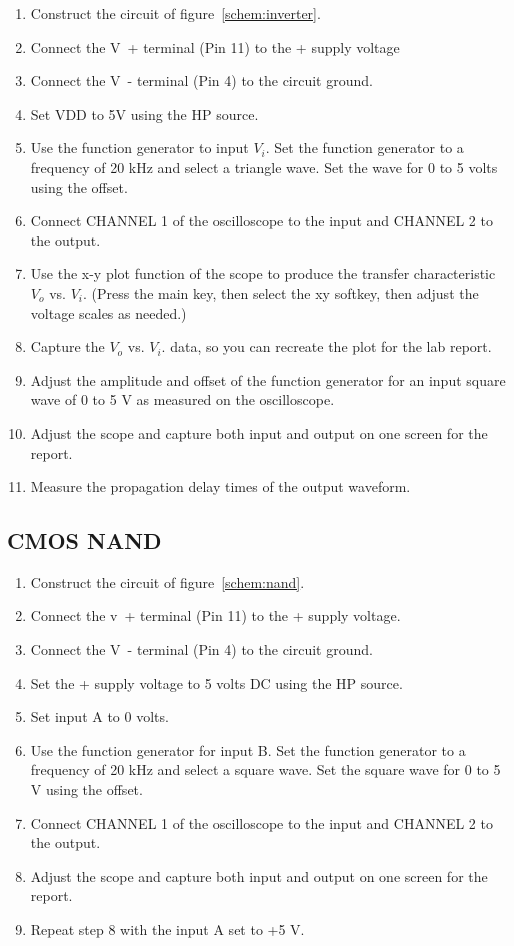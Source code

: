\begin{enumerate}
\item Construct the circuit of figure~\ref{schem:inverter}.
\item Connect the \si{V+} terminal (Pin 11) to the + supply voltage
\item Connect the \si{V-} terminal (Pin 4) to the circuit ground.
\item Set VDD to 5V using the HP source.
\item Use the function generator to input $V_i$. Set the function generator to a frequency of 20 kHz and select a triangle wave. Set the wave for 0 to 5 volts using the offset.
\item Connect CHANNEL 1 of the oscilloscope to the input and CHANNEL 2 to the output.
\item Use the x-y plot function of the scope to produce the transfer characteristic $V_o$ vs. $V_i$. (Press the main key, then select the xy softkey, then adjust the voltage scales as needed.)
\item Capture the $V_o$ vs. $V_i$.  data, so you can recreate the plot for the lab report.
\item Adjust the amplitude and offset of the function generator for an input square wave of 0 to 5 V as measured on the oscilloscope.
\item Adjust the scope and capture both input and output on one screen for the report.
\item Measure the propagation delay times of the output waveform.
\end{enumerate}

\subsection{CMOS NAND}
\label{sec:nand}

\begin{enumerate}
\item Construct the circuit of figure~\ref{schem:nand}.
\item Connect the \si{v+} terminal (Pin 11) to the + supply voltage.
\item Connect the \si{V-} terminal (Pin 4) to the circuit ground.
\item Set the + supply voltage to 5 volts DC using the HP source.
\item Set input A to 0 volts.
\item Use the function generator for input B. Set the function generator to a frequency of 20 kHz and select a square wave. Set the square wave for 0 to 5 V using the offset.
\item Connect CHANNEL 1 of the oscilloscope to the input and CHANNEL 2 to the output.
\item Adjust the scope and capture both input and output on one screen for the report.
\item Repeat step 8 with the input A set to +5 V.
\end{enumerate}

